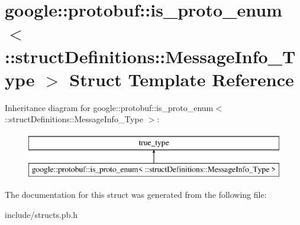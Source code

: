 \hypertarget{structgoogle_1_1protobuf_1_1is__proto__enum_3_01_1_1struct_definitions_1_1_message_info___type_01_4}{}\section{google\+:\+:protobuf\+:\+:is\+\_\+proto\+\_\+enum$<$ \+:\+:struct\+Definitions\+:\+:Message\+Info\+\_\+\+Type $>$ Struct Template Reference}
\label{structgoogle_1_1protobuf_1_1is__proto__enum_3_01_1_1struct_definitions_1_1_message_info___type_01_4}
Inheritance diagram for google\+:\+:protobuf\+:\+:is\+\_\+proto\+\_\+enum$<$ \+:\+:struct\+Definitions\+:\+:Message\+Info\+\_\+\+Type $>$\+:\begin{figure}[H]
\begin{center}
\leavevmode
\includegraphics[height=2.000000cm]{structgoogle_1_1protobuf_1_1is__proto__enum_3_01_1_1struct_definitions_1_1_message_info___type_01_4}
\end{center}
\end{figure}


The documentation for this struct was generated from the following file\+:\begin{DoxyCompactItemize}
\item 
include/structs.\+pb.\+h\end{DoxyCompactItemize}
